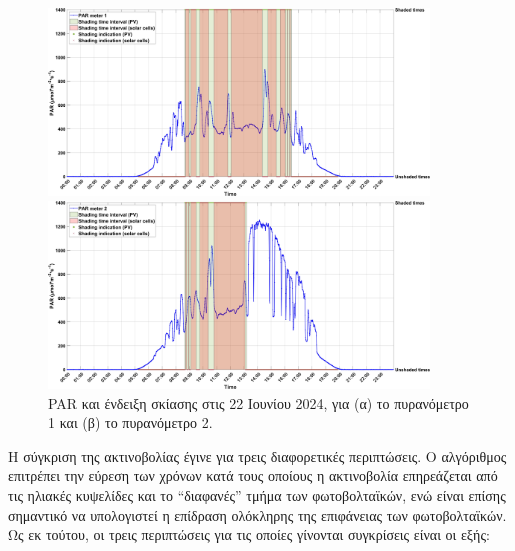 \documentclass[12pt, a4paper]{report} %
\newcommand{\english}{\foreignlanguage{english}}
\begin{document}
\begin{figure}[H]
    \begin{minipage}{1\textwidth}
        \centering
        \includegraphics[width=0.9\textwidth]{PAR_1_22_06.jpg}
        \caption*{\hspace{35pt}(α)}{}
    \end{minipage}
    
    \medskip

    \begin{minipage}{1\textwidth}
        \centering
        \includegraphics[width=0.9\textwidth]{PAR_2_22_06.jpg}
        \caption*{\hspace{35pt}(β)}{}
    \end{minipage}
    \caption{\english{PAR} και ένδειξη σκίασης στις 22 Ιουνίου 2024, για (α) το πυρανόμετρο 1 και (β) το πυρανόμετρο 2.}
    \label{fig_PAR_22_jun}
\end{figure}

Η σύγκριση της ακτινοβολίας έγινε για τρεις διαφορετικές περιπτώσεις. Ο αλγόριθμος επιτρέπει την εύρεση των χρόνων κατά τους 
οποίους η ακτινοβολία επηρεάζεται από τις ηλιακές κυψελίδες και το “διαφανές” τμήμα των φωτοβολταϊκών, ενώ είναι επίσης σημαντικό 
να υπολογιστεί η επίδραση ολόκληρης της επιφάνειας των φωτοβολταϊκών. Ως εκ τούτου, οι τρεις περιπτώσεις για τις οποίες 
γίνονται συγκρίσεις είναι οι εξής:
\end{document}
